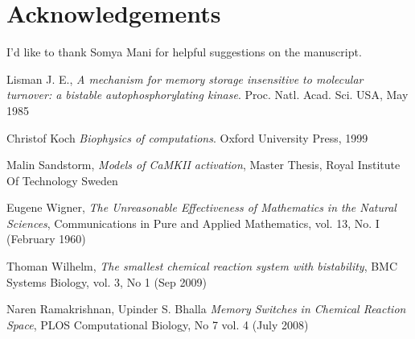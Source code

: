 \documentclass[]{resonance}
\begin{document}
\section*{Acknowledgements}
I'd like to thank Somya Mani for helpful suggestions on the manuscript.


\begin{thebibliography}{99} 
    Lisman J. E., 
    \textit{A mechanism for memory storage insensitive to molecular turnover: a
    bistable autophosphorylating kinase}. 
    Proc. Natl. Acad. Sci. USA, May 1985

    Christof Koch
    \textit{Biophysics of computations}.
    Oxford University Press, 1999

    Malin Sandstorm,
    \textit{Models of CaMKII activation},
    Master Thesis, Royal Institute Of Technology Sweden 

    Eugene Wigner,
    \textit{The Unreasonable Effectiveness of Mathematics in the Natural Sciences},
     Communications in Pure and Applied Mathematics, vol. 13, No. I (February 1960)

    Thoman Wilhelm,
    \textit{The smallest chemical reaction system with bistability},
    BMC Systems Biology, vol. 3, No 1 (Sep 2009)

    Naren Ramakrishnan, Upinder S. Bhalla
    \textit{Memory Switches in Chemical Reaction Space},
    PLOS Computational Biology, No 7 vol. 4 (July 2008)

\end{thebibliography}
\end{document}
